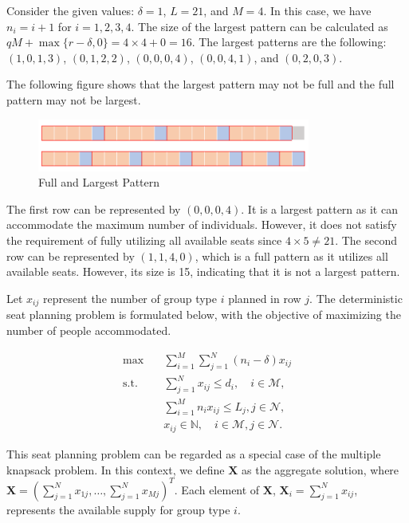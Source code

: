 \begin{example}
Consider the given values: $\delta = 1$, $L = 21$, and $M = 4$. In this case, we have $n_i = i + 1$ for $i = 1, 2, 3, 4$. The size of the largest pattern can be calculated as $qM + \max\{r-\delta, 0\} = 4 \times 4 + 0 = 16$. The largest patterns are the following: $(1, 0, 1, 3)$, $(0, 1, 2, 2)$, $(0, 0, 0, 4)$, $(0, 0, 4, 1)$, and $(0, 2, 0, 3)$.

The following figure shows that the largest pattern may not be full and the full pattern may not be largest.
\begin{figure}[ht]
    \centering
        \includegraphics[width=0.8\textwidth]{./Figures/full_largest.png}
    \caption{Full and Largest Pattern}
\end{figure}

The first row can be represented by $(0, 0, 0, 4)$. It is a largest pattern as it can accommodate the maximum number of individuals. However, it does not satisfy the requirement of fully utilizing all available seats since $4 \times 5 \neq 21$.
The second row can be represented by $(1, 1, 4, 0)$, which is a full pattern as it utilizes all available seats. However, its size is 15, indicating that it is not a largest pattern.
\end{example}


Let $x_{ij}$ represent the number of group type $i$ planned in row $j$. The deterministic seat planning problem is formulated below, with the objective of maximizing the number of people accommodated.

\begin{equation}\label{deter_upper}
    \begin{aligned}
    \max \quad & \sum_{i=1}^{M}  \sum_{j= 1}^{N} (n_i- \delta) x_{ij} \\
    \text {s.t.} \quad & \sum_{j= 1}^{N} x_{ij} \leq d_{i}, \quad i \in \mathcal{M}, \\
    & \sum_{i=1}^{M} n_{i} x_{ij} \leq L_j, j \in \mathcal{N}, \\
    & x_{ij} \in \mathbb{N}, \quad i \in \mathcal{M}, j \in \mathcal{N}.
    \end{aligned}
\end{equation}
  
This seat planning problem can be regarded as a special case of the multiple knapsack problem. In this context, we define $\bm{X}$ as the aggregate solution, where $\bm{X} = (\sum_{j=1}^{N} x_{1j}, \ldots, \sum_{j=1}^{N} x_{Mj})^T$. Each element of $\bm{X}$, $\bm{X}_{i} = \sum_{j=1}^{N} x_{ij}$, represents the available supply for group type $i$.
  

